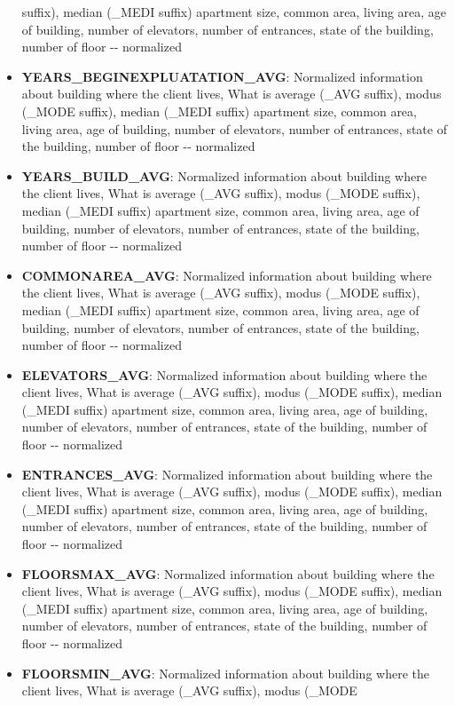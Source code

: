 \documentclass[11pt]{article}
\begin{document}
\begin{itemize}
  suffix), median (\_MEDI suffix) apartment size, common area, living
  area, age of building, number of elevators, number of entrances, state
  of the building, number of floor -\/- normalized
\item
  \textbf{YEARS\_BEGINEXPLUATATION\_AVG}: Normalized information about
  building where the client lives, What is average (\_AVG suffix), modus
  (\_MODE suffix), median (\_MEDI suffix) apartment size, common area,
  living area, age of building, number of elevators, number of
  entrances, state of the building, number of floor -\/- normalized
\item
  \textbf{YEARS\_BUILD\_AVG}: Normalized information about building
  where the client lives, What is average (\_AVG suffix), modus (\_MODE
  suffix), median (\_MEDI suffix) apartment size, common area, living
  area, age of building, number of elevators, number of entrances, state
  of the building, number of floor -\/- normalized
\item
  \textbf{COMMONAREA\_AVG}: Normalized information about building where
  the client lives, What is average (\_AVG suffix), modus (\_MODE
  suffix), median (\_MEDI suffix) apartment size, common area, living
  area, age of building, number of elevators, number of entrances, state
  of the building, number of floor -\/- normalized
\item
  \textbf{ELEVATORS\_AVG}: Normalized information about building where
  the client lives, What is average (\_AVG suffix), modus (\_MODE
  suffix), median (\_MEDI suffix) apartment size, common area, living
  area, age of building, number of elevators, number of entrances, state
  of the building, number of floor -\/- normalized
\item
  \textbf{ENTRANCES\_AVG}: Normalized information about building where
  the client lives, What is average (\_AVG suffix), modus (\_MODE
  suffix), median (\_MEDI suffix) apartment size, common area, living
  area, age of building, number of elevators, number of entrances, state
  of the building, number of floor -\/- normalized
\item
  \textbf{FLOORSMAX\_AVG}: Normalized information about building where
  the client lives, What is average (\_AVG suffix), modus (\_MODE
  suffix), median (\_MEDI suffix) apartment size, common area, living
  area, age of building, number of elevators, number of entrances, state
  of the building, number of floor -\/- normalized
\item
  \textbf{FLOORSMIN\_AVG}: Normalized information about building where
  the client lives, What is average (\_AVG suffix), modus (\_MODE

\end{itemize}
\end{document}
